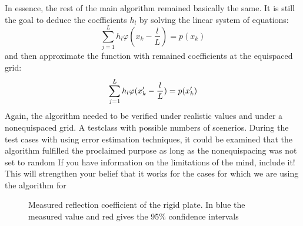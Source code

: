 \documentclass{article}
\begin{document}
In essence, the rest of the main algorithm remained basically the same.
It is still the goal to deduce the coefficients $h_{l}$ by solving the linear system of equations: 
\begin{equation}
\sum\limits_{j=1}^L h_{l}\varphi(x_{k}-\frac{l}{L})=p(x_{k})
\end{equation}
and then approximate the function with remained coefficients at the equispaced grid: 
\begin{equation}
 \sum\limits_{j=1}^L h_{l}\varphi(x'_{k}-\frac{l}{L})=p(x'_{k})\notag
\end{equation}
Again, the algorithm needed to be verified under realistic values and under a nonequispaced grid. A testclass with possible numbers of scenerios. 
During the test cases with using error estimation techniques, it could be examined that the algorithm fulfilled the proclaimed purpose as long as the nonequispacing was not set to random {\color{red} If you have information on the limitations of the mind, include it! This will strengthen your belief that it works for the cases for which we are using the algorithm for}

\begin{figure}[b]%
    \centering
    \caption{Measured reflection coefficient of the rigid plate. In blue the measured value and red gives the 95\% confidence intervals}
    \label{fig:ReflCoeff}
\end{figure} 
\end{document}
